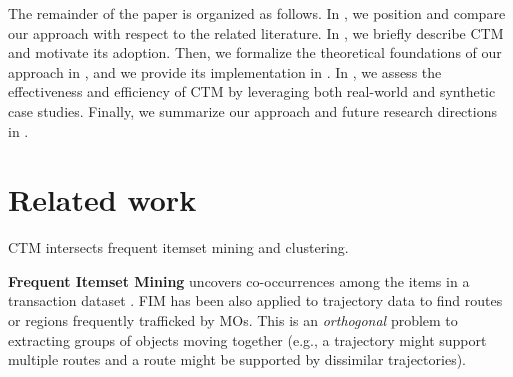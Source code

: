 \documentclass[
]{ceurart}
\begin{document}
The remainder of the paper is organized as follows.
In , we position and compare our approach with respect to the related literature.
In , we briefly describe CTM and motivate its adoption.
Then, we formalize the theoretical foundations of our approach in , and we provide its implementation in .
In , we assess the effectiveness and efficiency of CTM by leveraging both real-world and synthetic case studies. 
Finally, we summarize our approach and future research directions in .


\section{Related work}\label{sec:related}

CTM intersects frequent itemset mining and clustering. 

\textbf{Frequent Itemset Mining} uncovers co-occurrences among the items in a transaction dataset \citep{DBLP:conf/vldb/AgrawalS94}. 
FIM has been also applied to trajectory data to find routes \citep{DBLP:conf/ideal/QiuP16,DBLP:journals/access/FuTXZ17} or regions \citep{zheng2018spatial} frequently trafficked by MOs.
This is an \textit{orthogonal} problem to extracting groups of objects moving together (e.g., a trajectory might support multiple routes and a route might be supported by dissimilar trajectories).
\end{document}
